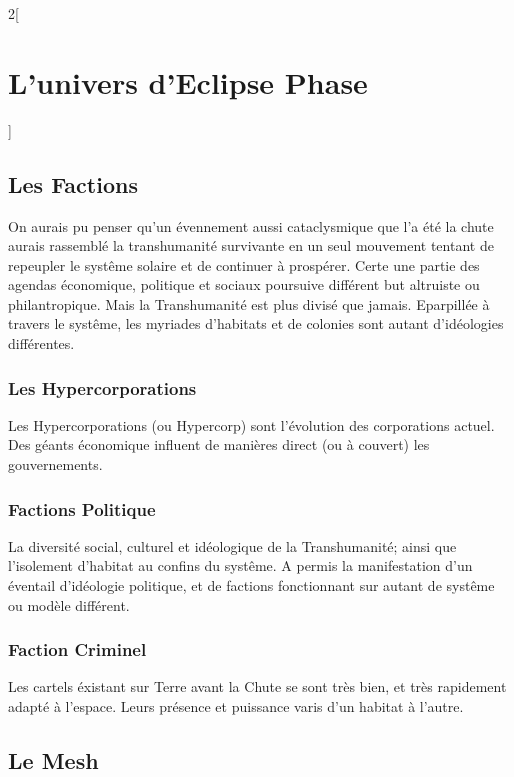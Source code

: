 \documentclass[a4paper,9pt]{article}
\begin{document}
\begin{multicols}{2}[\section{L'univers d'Eclipse Phase}]

\subsection{Les Factions}

On aurais pu penser qu'un évennement aussi cataclysmique que l'a été la chute
aurais rassemblé la transhumanité survivante en un seul mouvement tentant de
repeupler le systême solaire et de continuer à prospérer. Certe une partie des
agendas économique, politique et sociaux poursuive différent but altruiste ou
philantropique.  Mais la Transhumanité est plus divisé que jamais. Eparpillée à
travers le systême, les myriades d'habitats et de colonies sont autant
d'idéologies différentes.

\subsubsection{Les Hypercorporations}

Les Hypercorporations (ou Hypercorp) sont l'évolution des corporations actuel.
Des géants économique influent de manières direct (ou à couvert) les gouvernements.

\subsubsection{Factions Politique}

La diversité social, culturel et idéologique de la Transhumanité; ainsi que l'isolement
d'habitat au confins du systême. A permis la manifestation d'un éventail d'idéologie
politique, et de factions fonctionnant sur autant de systême ou modèle différent.

\subsubsection{Faction Criminel}

Les cartels éxistant sur Terre avant la Chute se sont très bien, et très rapidement
adapté à l'espace. Leurs présence et puissance varis d'un habitat à l'autre.

\subsection{Le Mesh}


\end{multicols}
\end{document}
